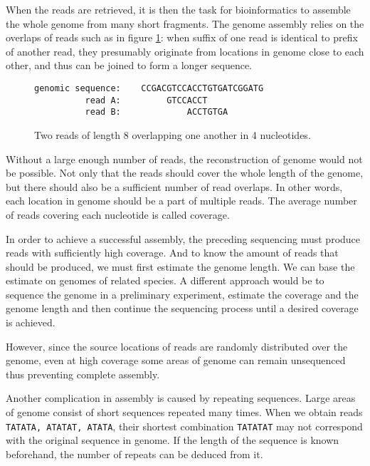 When the reads are retrieved, it is then the task for bioinformatics to assemble the whole genome from many short fragments.
The genome assembly relies on the overlaps of reads such as in figure \ref{fig:overlapping-reads}:
when suffix of one read is identical to prefix of another read, they presumably originate from locations in genome close to each other,
and thus can be joined to form a longer sequence.

\begin{figure}[h]
\centering
\begin{varwidth}{\linewidth}
\begin{verbatim}
genomic sequence:    CCGACGTCCACCTGTGATCGGATG
          read A:         GTCCACCT
          read B:             ACCTGTGA
\end{verbatim}
\end{varwidth}
\caption[Two overlapping reads]{Two reads of length 8 overlapping one another in 4 nucleotides.}
\label{fig:overlapping-reads}
\end{figure}

Without a large enough number of reads, the reconstruction of genome would not be possible.
Not only that the reads should cover the whole length of the genome, but there should also be a sufficient number of read overlaps.
In other words, each location in genome should be a part of multiple reads. The average number of reads covering each nucleotide
is called coverage. %

In order to achieve a successful assembly, the preceding sequencing must produce reads with sufficiently high coverage.
And to know the amount of reads that should be produced, we must first estimate the genome length. We can base the
estimate on genomes of related species. A different approach would be to sequence the genome in a preliminary experiment,
estimate the coverage and the genome length and then continue the sequencing process until a desired coverage is achieved.

However, since the source locations of reads are randomly distributed over the genome, even at high coverage
some areas of genome can remain unsequenced thus preventing complete assembly.

\medskip

Another complication in assembly is caused by repeating sequences. Large areas of genome consist of short sequences repeated many times.
When we obtain reads \texttt{TATATA, ATATAT, ATATA}, their shortest combination \texttt{TATATAT} may not correspond with the original sequence in genome.
If the length of the sequence is known beforehand, the number of repeats can be deduced from it.

